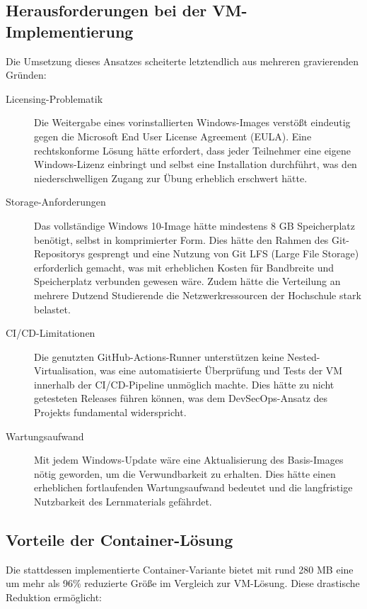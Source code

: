 \documentclass{article}
\begin{document}
\subsection{Herausforderungen bei der VM-Implementierung}
Die Umsetzung dieses Ansatzes scheiterte letztendlich aus mehreren gravierenden Gründen:

\begin{description}
  \item[Licensing-Problematik] Die Weitergabe eines vorinstallierten Windows-Images verstößt eindeutig gegen die Microsoft End User License Agreement (EULA). Eine rechtskonforme Lösung hätte erfordert, dass jeder Teilnehmer eine eigene Windows-Lizenz einbringt und selbst eine Installation durchführt, was den niederschwelligen Zugang zur Übung erheblich erschwert hätte.
  
  \item[Storage-Anforderungen] Das vollständige Windows 10-Image hätte mindestens 8 GB Speicherplatz benötigt, selbst in komprimierter Form. Dies hätte den Rahmen des Git-Repositorys gesprengt und eine Nutzung von Git LFS (Large File Storage) erforderlich gemacht, was mit erheblichen Kosten für Bandbreite und Speicherplatz verbunden gewesen wäre. Zudem hätte die Verteilung an mehrere Dutzend Studierende die Netzwerkressourcen der Hochschule stark belastet.
  
  \item[CI/CD-Limitationen] Die genutzten GitHub-Actions-Runner unterstützen keine Nested-Virtualisation, was eine automatisierte Überprüfung und Tests der VM innerhalb der CI/CD-Pipeline unmöglich machte. Dies hätte zu nicht getesteten Releases führen können, was dem DevSecOps-Ansatz des Projekts fundamental widerspricht.
  
  \item[Wartungsaufwand] Mit jedem Windows-Update wäre eine Aktualisierung des Basis-Images nötig geworden, um die Verwundbarkeit zu erhalten. Dies hätte einen erheblichen fortlaufenden Wartungsaufwand bedeutet und die langfristige Nutzbarkeit des Lernmaterials gefährdet.
\end{description}

\subsection{Vorteile der Container-Lösung}
Die stattdessen implementierte Container-Variante bietet mit rund 280 MB eine um mehr als 96\% reduzierte Größe im Vergleich zur VM-Lösung. 
Diese drastische Reduktion ermöglicht:
\end{document}
